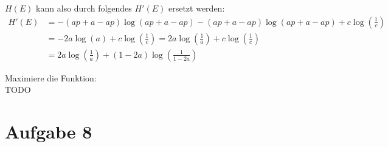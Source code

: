 \begin{myList}
$H(E)$ kann also durch folgendes $H'(E)$ ersetzt werden:
\begin{align*}
	H'(E) &= -(ap + a - ap)\log(ap + a - ap) -(ap + a - ap)\log(ap + a - ap) + c \log \left(\frac{1}{c} \right)\\
	&= -2a\log(a) + c \log \left(\frac{1}{c} \right) = 2 a\log \left( \frac{1}{a}\right) + c \log \left(\frac{1}{c} \right) \\
	&= 2 a\log \left( \frac{1}{a}\right) + (1-2a) \log \left(\frac{1}{1 - 2a} \right)
\end{align*}

Maximiere die Funktion:\\
TODO
\end{myList}

\section*{Aufgabe 8}
